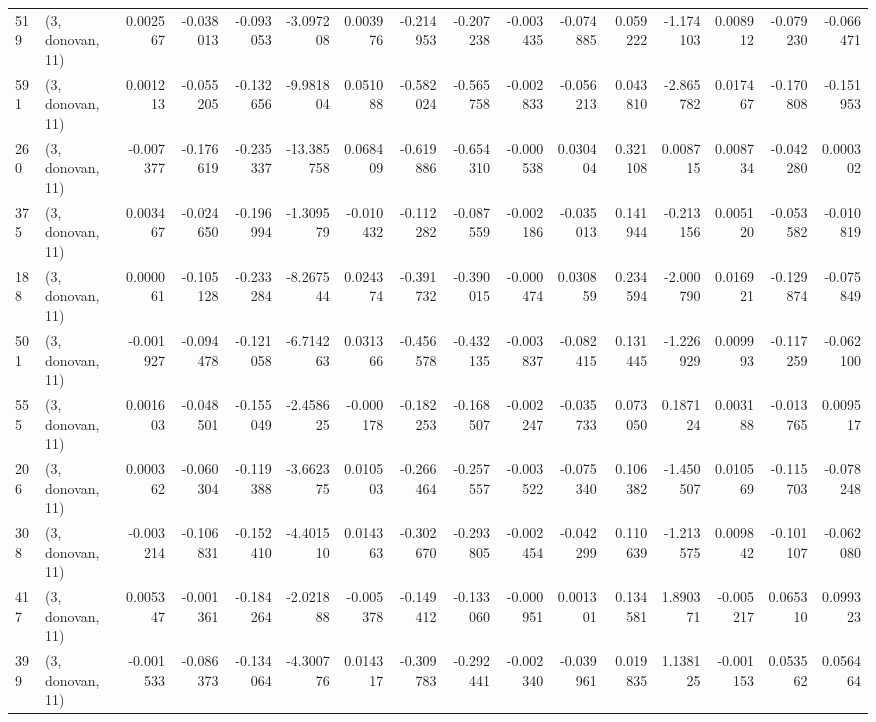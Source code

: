 \begin{tabular}{llrrrrrrrrrrrrrr}
519 &  (3, donovan, 11) &   0.002567 & -0.038013 & -0.093053 &   -3.097208 &  0.003976 &  -0.214953 &  -0.207238 & -0.003435 & -0.074885 &  0.059222 &   -1.174103 &  0.008912 &  -0.079230 &  -0.066471 \\
591 &  (3, donovan, 11) &   0.001213 & -0.055205 & -0.132656 &   -9.981804 &  0.051088 &  -0.582024 &  -0.565758 & -0.002833 & -0.056213 &  0.043810 &   -2.865782 &  0.017467 &  -0.170808 &  -0.151953 \\
260 &  (3, donovan, 11) &  -0.007377 & -0.176619 & -0.235337 &  -13.385758 &  0.068409 &  -0.619886 &  -0.654310 & -0.000538 &  0.030404 &  0.321108 &    0.008715 &  0.008734 &  -0.042280 &   0.000302 \\
375 &  (3, donovan, 11) &   0.003467 & -0.024650 & -0.196994 &   -1.309579 & -0.010432 &  -0.112282 &  -0.087559 & -0.002186 & -0.035013 &  0.141944 &   -0.213156 &  0.005120 &  -0.053582 &  -0.010819 \\
188 &  (3, donovan, 11) &   0.000061 & -0.105128 & -0.233284 &   -8.267544 &  0.024374 &  -0.391732 &  -0.390015 & -0.000474 &  0.030859 &  0.234594 &   -2.000790 &  0.016921 &  -0.129874 &  -0.075849 \\
501 &  (3, donovan, 11) &  -0.001927 & -0.094478 & -0.121058 &   -6.714263 &  0.031366 &  -0.456578 &  -0.432135 & -0.003837 & -0.082415 &  0.131445 &   -1.226929 &  0.009993 &  -0.117259 &  -0.062100 \\
555 &  (3, donovan, 11) &   0.001603 & -0.048501 & -0.155049 &   -2.458625 & -0.000178 &  -0.182253 &  -0.168507 & -0.002247 & -0.035733 &  0.073050 &    0.187124 &  0.003188 &  -0.013765 &   0.009517 \\
206 &  (3, donovan, 11) &   0.000362 & -0.060304 & -0.119388 &   -3.662375 &  0.010503 &  -0.266464 &  -0.257557 & -0.003522 & -0.075340 &  0.106382 &   -1.450507 &  0.010569 &  -0.115703 &  -0.078248 \\
308 &  (3, donovan, 11) &  -0.003214 & -0.106831 & -0.152410 &   -4.401510 &  0.014363 &  -0.302670 &  -0.293805 & -0.002454 & -0.042299 &  0.110639 &   -1.213575 &  0.009842 &  -0.101107 &  -0.062080 \\
417 &  (3, donovan, 11) &   0.005347 & -0.001361 & -0.184264 &   -2.021888 & -0.005378 &  -0.149412 &  -0.133060 & -0.000951 &  0.001301 &  0.134581 &    1.890371 & -0.005217 &   0.065310 &   0.099323 \\
399 &  (3, donovan, 11) &  -0.001533 & -0.086373 & -0.134064 &   -4.300776 &  0.014317 &  -0.309783 &  -0.292441 & -0.002340 & -0.039961 &  0.019835 &    1.138125 & -0.001153 &   0.053562 &   0.056464 \\

\end{tabular}
